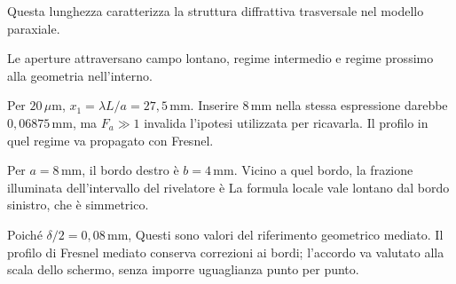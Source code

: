 \ExSolution


Questa lunghezza caratterizza la struttura diffrattiva trasversale nel modello paraxiale.


Le aperture attraversano campo lontano, regime intermedio e regime prossimo alla geometria nell’interno.


Per \(20\,\mu\mathrm m\), \(x_1=\lambda L/a=27{,}5\,\mathrm{mm}\). Inserire \(8\,\mathrm{mm}\) nella stessa espressione darebbe \(0{,}06875\,\mathrm{mm}\), ma \(F_a\gg1\) invalida l’ipotesi utilizzata per ricavarla. Il profilo in quel regime va propagato con Fresnel.


Per \(a=8\,\mathrm{mm}\), il bordo destro è \(b=4\,\mathrm{mm}\). Vicino a quel bordo, la frazione illuminata dell’intervallo del rivelatore è
La formula locale vale lontano dal bordo sinistro, che è simmetrico.


Poiché \(\delta/2=0{,}08\,\mathrm{mm}\),
Questi sono valori del riferimento geometrico mediato. Il profilo di Fresnel mediato conserva correzioni ai bordi; l’accordo va valutato alla scala dello schermo, senza imporre uguaglianza punto per punto.

